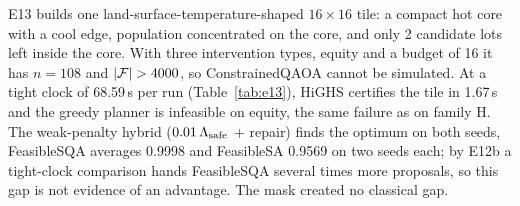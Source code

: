 E13 builds one land-surface-temperature-shaped $16\times16$ tile: a compact hot core with a cool
edge, population concentrated on the core, and only 2 candidate lots left inside the core. With
three intervention types, equity and a budget of 16 it has $n=108$ and $|\Fset|>4000$, so
ConstrainedQAOA cannot be simulated. At a tight clock of 68.59\,s per run (Table~\ref{tab:e13}),
HiGHS certifies the tile in 1.67\,s and the greedy planner is infeasible on equity, the same failure
as on family H. The weak-penalty hybrid ($0.01\,\Lambda_{\mathrm{safe}}$ + repair) finds the optimum on both seeds,
FeasibleSQA averages 0.9998 and FeasibleSA 0.9569 on two seeds each; by E12b a tight-clock
comparison hands FeasibleSQA several times more proposals, so this gap is not evidence of an
advantage. The mask created no classical gap.

